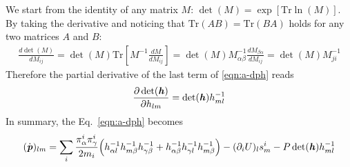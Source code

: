 \documentclass[aps, pre, preprint,unsortedaddress,a4paper,onecolumn]{revtex4}
\newcommand{\vect}[1]{\textbf{\textit{#1}}}
\newcommand{\trace}{\textrm{Tr}}
\begin{document}
We start from the identity of any matrix $M$: $\det (M) = \exp [\trace \ln (M) ]$. By taking the derivative and
noticing that $\trace( AB ) = \trace (BA)$ holds for any two matrices $A$ and $B$:
\begin{align}
  \frac{d \det(M)}{dM_{ij}} = \det ( M) \trace[ M^{-1} \frac{d M}{d M_{ij}} ] = \det(M) M^{-1}_{\alpha\beta} \frac{dM_{\beta\alpha}}{d M_{ij}}
  = \det(M) M^{-1}_{ji}
\end{align}
Therefore the partial derivative of the last term of \eqref{eqn:a-dph} reads
\begin{align}
  \frac{\partial \det(\vect h)}{\partial h_{lm}} = \det (\vect h) h^{-1}_{ml}
\end{align}
In summary, the Eq.~\eqref{eqn:a-dph} becomes
\begin{align}
  (\dot {\vect p})_{lm}
  = \sum_i\frac{\pi^i_\alpha\pi^i_\gamma}{2m_i}
  \Big(
  h^{-1}_{\alpha l}  h^{-1}_{ m\beta}h^{-1}_{\gamma\beta} 
  +
  h^{-1}_{\alpha\beta} h^{-1}_{\gamma l}  h^{-1}_{ m\beta}
  \Big)
  - (\partial_i U)_l  s^i_{m}
  - P \det (\vect h) h^{-1}_{ml}
\end{align}
\end{document}
